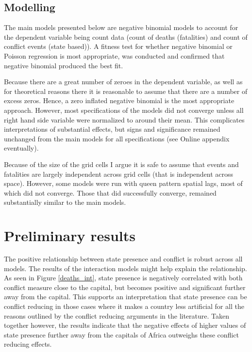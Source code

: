 \documentclass[12pt]{article}
\begin{document}
\subsection{Modelling}

The main models presented below are negative binomial models to account for the
dependent variable being count data (count of deaths (fatalities) and count of
conflict events (state based)). A fitness test for whether negative binomial or
Poisson regression is most appropriate, was conducted and confirmed that
negative binomial produced the best fit.

Because there are a great number of zeroes in the dependent variable, as well
as for theoretical reasons there it is reasonable to assume that there are a
number of excess zeros. Hence, a zero inflated negative binomial is the most
appropriate approach. However, most specifications of the models did not
converge unless all right hand side variable were normalized to around their
mean. This complicates interpretations of substantial effects, but signs and
significance remained unchanged from the main models for all specifications (see
Online appendix eventually).

Because of the size of the grid cells I argue it is safe to assume that events
and fatalities are largely independent across grid cells (that is independent
across space). However, some models were run with queen pattern spatial lags,
most of which did not converge. Those that did successfully converge, remained
substantially similar to the main models.

\section{Preliminary results}

The positive relationship between state presence and conflict is robust across
all models. The results of the interaction models might help explain the
relationship. As seen in Figure \ref{deaths_int}, state presence is negatively
correlated with both conflict measure close to the capital, but becomes positive
and significant further away from the capital. This supports an interpretation
that state presence can be conflict reducing in those cases where it makes a
country less artificial for all the reasons outlined by the conflict reducing
arguments in the literature. Taken together however, the results indicate that
the negative effects of higher values of state presence further away from the
capitals of Africa outweighs these conflict reducing effects. 
\end{document}
